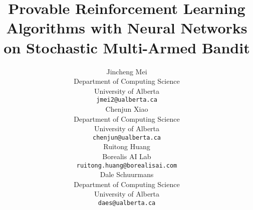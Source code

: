 \documentclass{article}
\title{Provable Reinforcement Learning Algorithms with Neural Networks on Stochastic Multi-Armed Bandit
}
\author{
  Jincheng Mei \\
  Department of Computing Science\\
  University of Alberta\\
  \texttt{jmei2@ualberta.ca} \\
  \And
  Chenjun Xiao \\
  Department of Computing Science\\
  University of Alberta\\
  \texttt{chenjun@ualberta.ca} \\
  \AND
  Ruitong Huang \\
  Borealis AI Lab\\
  \texttt{ruitong.huang@borealisai.com} \\
  \And
  Dale Schuurmans \\
  Department of Computing Science\\
  University of Alberta\\
  \texttt{daes@ualberta.ca} \\
}
\begin{document}

\maketitle

\begin{abstract}

\end{abstract}















{\small


}

\newpage
\appendix

\end{document}

